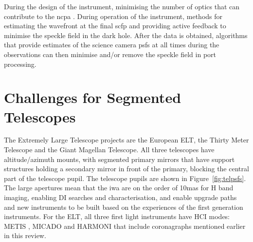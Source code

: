 \documentclass[letterpaper]{ar-1col}
\begin{document}
During the design of the instrument, minimising the number of optics that can contribute to the \ac{ncpa} \citep[by making the optics optomechanically and thermally stable; ][]{Absil24}.
%
During operation of the instrument, methods for estimating the wavefront at the final \ac{scfp} and providing active feedback to minimise the speckle field in the dark hole.
%    
After the data is obtained, algorithms that provide estimates of the science camera \acp{psf} at all times during the observations can then minimise and/or remove the speckle field in port processing.









\section{Challenges for Segmented Telescopes}

The Extremely Large Telescope projects are the European ELT, the Thirty Meter Telescope and the Giant Magellan Telescope.
%
All three telescopes have altitude/azimuth mounts, with segmented primary mirrors that have support structures holding a secondary mirror in front of the primary, blocking the central part of the telescope pupil.
%
The telescope pupils are shown in Figure~\ref{fig:telpsfs}.
%
The large apertures mean that the \ac{iwa} are on the order of 10mas for H band imaging, enabling DI searches and characterisation, and enable upgrade paths and new instruments to be built based on the experiences of the first generation instruments.
%
For the ELT, all three first light instruments have HCI modes: METIS \citep{Brandl22,Absil24}, MICADO \citep{Sturm24,Huby24} and HARMONI \citep{Thatte22,Houlle21} that include coronagraphs mentioned earlier in this review.
%
\end{document}
